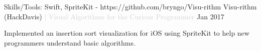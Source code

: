 \begin{cventries}
  \cventry
  {Skills/Tools: Swift, SpriteKit - https://github.com/bryngo/Visu-rithm} %
  {Visu-rithm (HackDavis) \textcolor{lightgray}{| Visual Algorithms for the Curious Programmer}} %
  {} %
  {Jan 2017} %
  {
  \begin{cvitems} %
    \item {Implemented an insertion sort visualization for iOS using SpriteKit to help new programmers understand basic algorithms.}
  \end{cvitems}
  }

\end{cventries}
